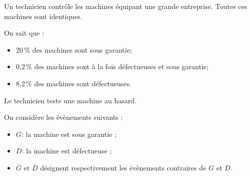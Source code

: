 Un technicien contrôle les machines équipant une grande entreprise. Toutes ces machines sont identiques.

On sait que :

\begin{itemize}
\item[$\bullet~~$]20\,\% des machines sont sous garantie;
\item[$\bullet~~$]0,2\,\% des machines sont à la fois défectueuses et sous garantie;
\item[$\bullet~~$]8,2\,\% des machines sont défectueuses.
\end{itemize}

\smallskip

Le technicien teste une machine au hasard.




On considère les évènements suivants :
\begin{itemize}
\item[$\bullet~~$]$G$: \og la machine est sous garantie \fg{} ;
\item[$\bullet~~$]$D$: \og la machine est défectueuse\fg{} ;
\item[$\bullet~~$]$\overline{G}$ et $\overline{D}$ désignent respectivement les évènements contraires de $G$ et $D$.
\end{itemize}


















